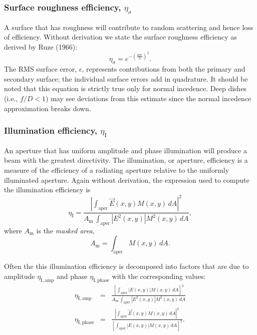\documentclass{article}
\begin{document}
\subsubsection{Surface roughness efficiency, $\eta_\sigma$}

A surface that has roughness will contribute to random scattering and
hence loss of efficiency.  Without derivation we state the surface roughness
efficiency as derived by Ruze (1966):
\begin{equation} \label{eqn:surf}
\eta_\sigma = e^{-\left(\frac{4 \pi \epsilon}{\lambda}\right)^2}.
\end{equation}
The RMS surface error, $\epsilon$, represents contributions from both
the primary and secondary surface; the individual surface errors add in
quadrature.  It should be noted that this equation is strictly true only
for normal incedence.  Deep dishes (i.e., $f/D < 1$) may see deviations from
this estimate since the normal incedence approximation breaks down.

\subsubsection{Illumination efficiency, $\eta_\mathrm{I}$}

An aperture that has uniform amplitude and phase illumination will produce
a beam with the greatest directivity.  The illumination, or aperture, 
efficiency is a measure of the efficiency of a radiating aperture relative
to the uniformly illuminated aperture.  Again without derivation, the
expression used to compute the illumination efficiency is
\begin{equation}
\eta_\mathrm{I} = \frac{\left|\int_\mathrm{aper} \vec{E}(x, y) M(x, y) \, dA
\right|^2}{A_\mathrm{m} \, \int_\mathrm{aper} \left|E^2(x, y)\right|
M^2(x, y) \, dA},
\end{equation}
where $A_\mathrm{m}$ is the {\it masked area},
\begin{equation}
A_\mathrm{m} = \int_\mathrm{aper} M(x, y) \, dA.
\end{equation}

Often the this illumination efficiency is decomposed into factors that
are due to amplitude $\eta_\mathrm{I,amp}$ and phase
$\eta_\mathrm{I,phase}$ with the corresponding values:
\begin{eqnarray}
\eta_\mathrm{I,amp} & = & \frac{\left[\int_\mathrm{aper} \left|E(x, y)\right|
M(x, y) \, dA \right]^2}
{A_\mathrm{m} \, \int_\mathrm{aper} \left|E^2(x, y)\right|
M^2(x, y) \, dA} \\
\eta_\mathrm{I,phase} & = & \frac{\left|\int_\mathrm{aper} \vec{E}(x, y) 
M(x, y) \, dA \right|^2}{\left[\int_\mathrm{aper} \left|E(x, y)\right|
M(x, y) \, dA\right]^2}.
\end{eqnarray}
\end{document}
